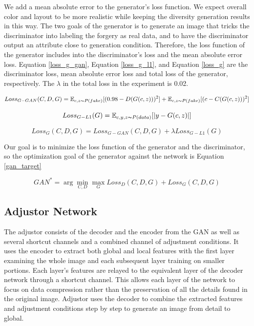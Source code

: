 We add a mean absolute error to the generator's loss function.
We expect overall color and layout to be more realistic while keeping the diversity generation results in this way.
The two goals of the generator is to generate an image that tricks the discriminator into labeling the forgery as real data,
    and to have the discriminator output an attribute close to generation condition.
Therefore, the loss function of the generator includes into the discriminator's loss and the mean absolute error loss.
Equation \eqref{loss_g_gan}, Equation \eqref{loss_g_l1}, and Equation \eqref{loss_g} are the discriminator loss,
    mean absolute error loss and total loss of the generator, respectively.
The $\lambda$ in the total loss in the experiment is 0.02.

\begin{equation}
    Loss_{G-GAN}(C,D,G)=
    \mathbb{E}_{c,z\thicksim P(fake)}[(0.98-D(G(c,z)))^2]+
    \mathbb{E}_{c,z\thicksim P(fake)}[(c-C(G(c,z)))^2]
    \label{loss_g_gan}
\end{equation}

\begin{equation}
    Loss_{G-L1}(G)=
    \mathbb{E}_{c,y,z\thicksim P(data)}[|y-G(c,z)|]
    \label{loss_g_l1}
\end{equation}

\begin{equation}
    Loss_{G}(C,D,G)=
    Loss_{G-GAN}(C,D,G)+
    \lambda Loss_{G-L1}(G)
    \label{loss_g}
\end{equation}

Our goal is to minimize the loss function of the generator and the discriminator,
    so the optimization goal of the generator against the network is Equation \eqref{gan_target}

\begin{equation}
    GAN^*=\arg \min_{C,D} \max_{G}Loss_{D}(C,D,G)+Loss_{G}(C,D,G)
    \label{gan_target}
\end{equation}


\subsection{Adjustor Network}
The adjustor consists of the decoder and the encoder from the GAN as well as several shortcut channels and a combined channel of adjustment conditions.
It uses the encoder to extract both global and local features with the first layer examining the whole image and each subsequent layer training on smaller portions. Each layer’s features are relayed to the equivalent layer of the decoder network through a shortcut channel.
This allows each layer of the network to focus on data compression rather than the preservation of all the details found in the original image. 
Adjustor uses the decoder to combine the extracted features and adjustment conditions step by step to generate an image from detail to global.

